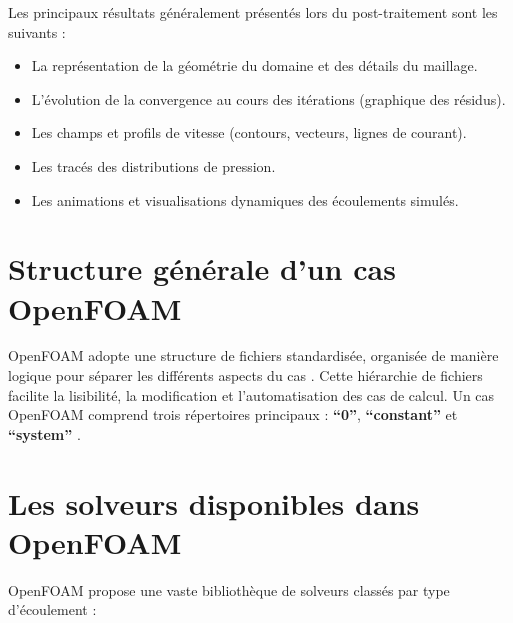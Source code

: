 Les principaux résultats généralement présentés lors du post-traitement sont les suivants \cite{hansen2011visualization} :
\begin{itemize}
    \item La représentation de la géométrie du domaine et des détails du maillage.
    \item L'évolution de la convergence au cours des itérations (graphique des résidus).
    \item Les champs et profils de vitesse (contours, vecteurs, lignes de courant).
    \item Les tracés des distributions de pression.
    \item Les animations et visualisations dynamiques des écoulements simulés.
\end{itemize}

\section{Structure générale d'un cas OpenFOAM}
\label{sec:structure_openfoam}

OpenFOAM adopte une structure de fichiers standardisée, organisée de manière logique pour séparer les différents aspects du cas \cite{openfoam2022guide}. Cette hiérarchie de fichiers facilite la lisibilité, la modification et l'automatisation des cas de calcul. Un cas OpenFOAM comprend trois répertoires principaux : \textbf{``0''}, \textbf{``constant''} et \textbf{``system''} \cite{greenshields2020openfoam}.

\section{Les solveurs disponibles dans OpenFOAM}
\label{sec:solveurs_openfoam}

OpenFOAM propose une vaste bibliothèque de solveurs classés par type d'écoulement \cite{jasak1996error} :

